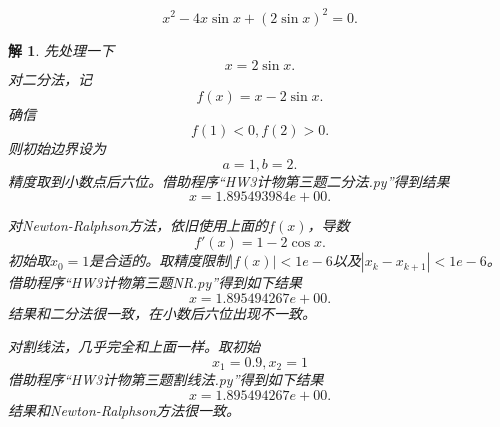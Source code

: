 \documentclass[10pt]{ctexart}
\newtheorem*{solution}{解}
\begin{document}
$$x^2-4x\sin{x}+(2\sin{x})^2=0.$$
\begin{solution}
    先处理一下
    $$x=2\sin{x}.$$
    对二分法，记
    $$f(x)=x-2\sin{x}.$$
    确信
    $$f(1)<0,f(2)>0.$$
    则初始边界设为
    $$a=1,b=2.$$
    精度取到小数点后六位。借助程序“HW3计物第三题二分法.py”得到结果
    $$x=1.895493984e+00.$$

    对Newton-Ralphson方法，依旧使用上面的$f(x)$，导数
    $$f'(x)=1-2\cos{x}.$$
    初始取$x_0=1$是合适的。取精度限制$|f(x)|<1e-6$以及$|x_k-x_{k+1}|<1e-6$。借助程序“HW3计物第三题NR.py”得到如下结果
    $$x=1.895494267e+00.$$
    结果和二分法很一致，在小数后六位出现不一致。

    对割线法，几乎完全和上面一样。取初始$$x_1=0.9,x_2=1$$借助程序“HW3计物第三题割线法.py”得到如下结果
    $$x=1.895494267e+00.$$
    结果和Newton-Ralphson方法很一致。
\end{solution}
\end{document}
